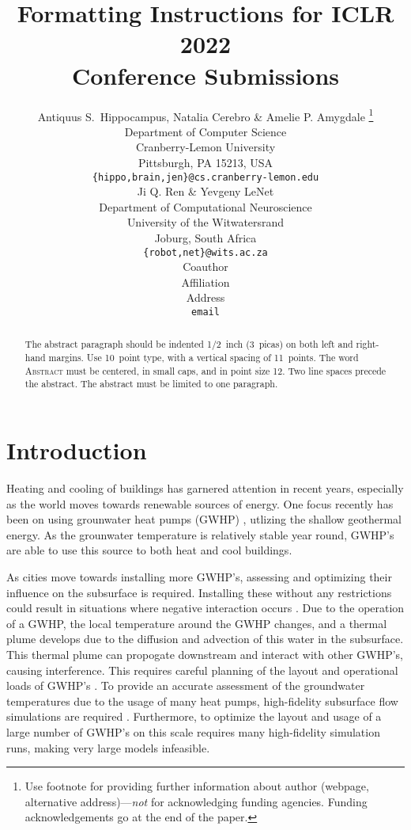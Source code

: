 \documentclass{article} %
\title{Formatting Instructions for ICLR 2022 \\ Conference Submissions}
\author{Antiquus S.~Hippocampus, Natalia Cerebro \& Amelie P. Amygdale \thanks{ Use footnote for providing further information
about author (webpage, alternative address)---\emph{not} for acknowledging
funding agencies.  Funding acknowledgements go at the end of the paper.} \\
Department of Computer Science\\
Cranberry-Lemon University\\
Pittsburgh, PA 15213, USA \\
\texttt{\{hippo,brain,jen\}@cs.cranberry-lemon.edu} \\
\And
Ji Q. Ren \& Yevgeny LeNet \\
Department of Computational Neuroscience \\
University of the Witwatersrand \\
Joburg, South Africa \\
\texttt{\{robot,net\}@wits.ac.za} \\
\AND
Coauthor \\
Affiliation \\
Address \\
\texttt{email}
}
\begin{document}
\maketitle

\begin{abstract}
   The abstract paragraph should be indented 1/2~inch (3~picas) on both left and
   right-hand margins. Use 10~point type, with a vertical spacing of 11~points.
   The word \textsc{Abstract} must be centered, in small caps, and in point size 12. Two
   line spaces precede the abstract. The abstract must be limited to one
   paragraph.
\end{abstract}

\section{Introduction}
\label{sec:intro}

Heating and cooling of buildings has garnered attention in recent years, especially as the world moves towards renewable sources of energy. 
One focus recently has been on using grounwater heat pumps (GWHP) \cite{Halilovic2022}, utlizing the shallow geothermal energy. 
As the grounwater temperature is relatively stable year round, GWHP's are able to use this source to both heat and cool buildings. %

As cities move towards installing more GWHP's, assessing and optimizing their influence on the subsurface is required. 
Installing these without any restrictions could result in situations where negative interaction occurs \cite{Garcia2020, Daemi2019}. 
Due to the operation of a GWHP, the local temperature around the GWHP changes, and a thermal plume develops due to the diffusion and advection of this water in the subsurface. 
This thermal plume can propogate downstream and interact with other GWHP's, causing interference. 
This requires careful planning of the layout and operational loads of GWHP's \cite{Beck2013}. 
To provide an accurate assessment of the groundwater temperatures due to the usage of many heat pumps, high-fidelity subsurface flow simulations are required \cite{Menga2019}. 
Furthermore, to optimize the layout and usage of a large number of GWHP's on this scale requires many high-fidelity simulation runs, making very large models infeasible.
\end{document}
